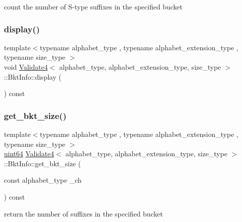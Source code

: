 count the number of S-\/type suffixes in the specified bucket 

\mbox{\label{struct_validate4_1_1_bkt_info_ad8bc43e62d48c2f33fc6173f2a1d0840}} 
\subsubsection{\texorpdfstring{display()}{display()}}
{\footnotesize\ttfamily template$<$typename alphabet\+\_\+type , typename alphabet\+\_\+extension\+\_\+type , typename size\+\_\+type $>$ \\
void \hyperlink{class_validate4}{Validate4}$<$ alphabet\+\_\+type, alphabet\+\_\+extension\+\_\+type, size\+\_\+type $>$\+::Bkt\+Info\+::display (\begin{DoxyParamCaption}{ }\end{DoxyParamCaption}) const\hspace{0.3cm}{\ttfamily [inline]}}

\mbox{\label{struct_validate4_1_1_bkt_info_a22256d03bfca21336fa30f2ed9e12d51}} 
\subsubsection{\texorpdfstring{get\+\_\+bkt\+\_\+size()}{get\_bkt\_size()}}
{\footnotesize\ttfamily template$<$typename alphabet\+\_\+type , typename alphabet\+\_\+extension\+\_\+type , typename size\+\_\+type $>$ \\
\hyperlink{types_8h_a60e8696a4678cd348e991a1f172e53f7}{uint64} \hyperlink{class_validate4}{Validate4}$<$ alphabet\+\_\+type, alphabet\+\_\+extension\+\_\+type, size\+\_\+type $>$\+::Bkt\+Info\+::get\+\_\+bkt\+\_\+size (\begin{DoxyParamCaption}\item[{const alphabet\+\_\+type}]{\+\_\+ch }\end{DoxyParamCaption}) const\hspace{0.3cm}{\ttfamily [inline]}}



return the number of suffixes in the specified bucket 

